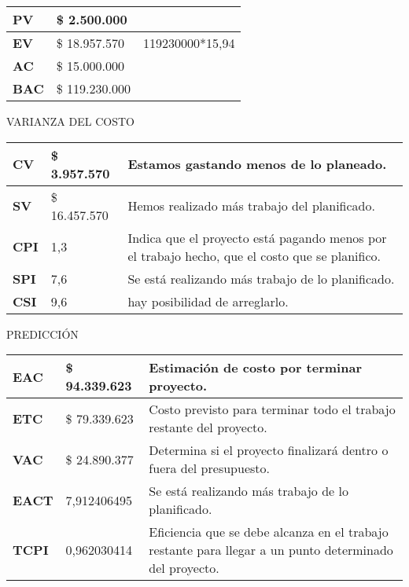 \documentclass[book,14pt,oneside]{report}
\begin{document}
 \setcounter{page}{1}
\pagestyle{fancy}

{\let\clearpage\relax\par}

%
\begin{table}[H]
	\centering
	\begin{tabular}{| p{1cm} | l | l |}
	\hline
	\textbf{PV} & \$ 2.500.000 & \\ \hline
	\textbf{EV} & \$ 18.957.570 & 119230000*15,94\\
	\hline
	\textbf{AC} & \$ 15.000.000 & \\ 
	\hline
	\textbf{BAC} & \$ 119.230.000 & \\
	\hline
	\end{tabular}
\end{table}
%
\begin{center}
	\Large{VARIANZA DEL COSTO}
\end{center}
%
\begin{table}[H]
	\centering
	\begin{tabular}{| p{1cm} | l | p{10cm} |}
	\hline
	\textbf{CV} & \$ 3.957.570 & Estamos gastando menos de lo planeado. \\ \hline
	\textbf{SV} & \$ 16.457.570 & Hemos realizado m\'as trabajo del planificado. \\
	\hline
	\textbf{CPI} & 1,3 & Indica que el proyecto est\'a pagando menos por el trabajo hecho, que el costo que se 
		planifico. \\ 
	\hline
	\textbf{SPI} & 7,6 & Se est\'a realizando m\'as trabajo de lo planificado. \\
	\hline
	\textbf{CSI} & 9,6 & hay posibilidad de arreglarlo. \\
	\hline
	\end{tabular}
\end{table}
%
\begin{center}
	\Large{PREDICCI\'ON}
\end{center}
%
\begin{table}[H]
	\centering
	\begin{tabular}{| p{1cm} | l | p{10cm} |}
	\hline
	\textbf{EAC} & \$ 94.339.623 & Estimaci\'on de costo por terminar proyecto. \\ \hline
	\textbf{ETC} & \$ 79.339.623 & Costo previsto para terminar todo el trabajo restante del proyecto. \\
	\hline
	\textbf{VAC} & \$ 24.890.377 & Determina si el proyecto finalizar\'a dentro o fuera del presupuesto. \\ 
	\hline
	\textbf{EACT} & 7,912406495 & Se est\'a realizando m\'as trabajo de lo planificado. \\
	\hline
	\textbf{TCPI} & 0,962030414 & Eficiencia que se debe alcanza en el trabajo restante para llegar a un punto 
		determinado del proyecto. \\
	\hline
	\end{tabular}
\end{table}
%
\end{document}
